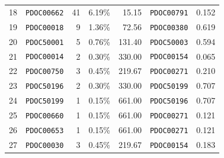 \documentclass[11pt,a4paper]{article}
\begin{document}
\begin{table}[htbp]
\begin{tabularx}{0.95\textwidth}{r l r r r l r}
18 & \texttt{PDOC00662} & 41 & 6.19\% & 15.15 & \texttt{PDOC00791} & 0.152 \\
19 & \texttt{PDOC00018} & 9 & 1.36\% & 72.56 & \texttt{PDOC00380} & 0.619 \\
20 & \texttt{PDOC50001} & 5 & 0.76\% & 131.40 & \texttt{PDOC50003} & 0.594 \\
21 & \texttt{PDOC00014} & 2 & 0.30\% & 330.00 & \texttt{PDOC00154} & 0.065 \\
22 & \texttt{PDOC00750} & 3 & 0.45\% & 219.67 & \texttt{PDOC00271} & 0.210 \\
23 & \texttt{PDOC50196} & 2 & 0.30\% & 330.00 & \texttt{PDOC50199} & 0.707 \\
24 & \texttt{PDOC50199} & 1 & 0.15\% & 661.00 & \texttt{PDOC50196} & 0.707 \\
25 & \texttt{PDOC00660} & 1 & 0.15\% & 661.00 & \texttt{PDOC00271} & 0.121 \\
26 & \texttt{PDOC00653} & 1 & 0.15\% & 661.00 & \texttt{PDOC00271} & 0.121 \\
27 & \texttt{PDOC00030} & 3 & 0.45\% & 219.67 & \texttt{PDOC00154} & 0.183 \\
\bottomrule
\end{tabularx}
\end{table}
\end{document}
